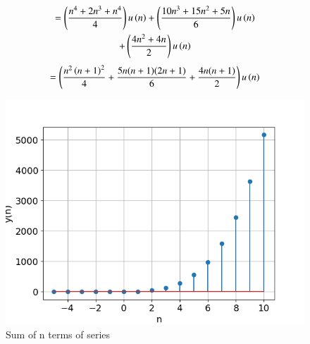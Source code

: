 \documentclass[journal,12pt,twocolumn]{IEEEtran}
\theoremstyle{remark}
\begin{document}
    \begin{multline}
        = \left(\frac{n^4+2n^3+n^4}{4}\right)u\left(n\right) +\left(\frac{10n^3+15n^2+5n}{6}\right)u\left(n\right)\\
        +\left(\frac{4n^2+4n}{2}\right)u\left(n\right)
    \end{multline}
    \begin{multline}
        = \left(\frac{n^2\left(n+1\right)^2}{4} + \frac{5n(n+1)(2n+1)}{6} 
        + \frac{4n(n+1)}{2}\right) u\left(n\right)
    \end{multline}
    \begin{figure}[!h] 
    \centering
    \includegraphics[width=\columnwidth]{figs/sumplot.png}
    \caption{Sum of n terms of series}
    \label{fig:Graph1_math.11.9.4.8}
    \end{figure}
\end{document}
